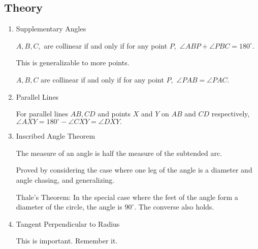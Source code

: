 \subsection{Theory}

\begin{enumerate}
    \item Supplementary Angles
    
    \begin{itemize}
    
    \Item $A,B,C,$ are collinear if and only if for any point $P,$ $\angle ABP+\angle PBC=180^{\circ}.$
    
    \Item This is generalizable to more points.
    
    \Item $A,B,C$ are collinear if and only if for any point $P,$ $\angle PAB=\angle PAC.$
    
    \end{itemize}
 
    \item Parallel Lines
    
    \begin{itemize}
    
    \Item For parallel lines $AB,CD$ and points $X$ and $Y$ on $AB$ and $CD$ respectively, $\angle AXY=180^{\circ}-\angle CXY=\angle DXY.$
    
    \end{itemize}
    
    \item Inscribed Angle Theorem
    
    \begin{itemize}
    
    \Item The measure of an angle is half the measure of the subtended arc.
    
    \Item Proved by considering the case where one leg of the angle is a diameter and angle chasing, and generalizing.
    
    \Item Thale's Theorem: In the special case where the feet of the angle form a diameter of the circle, the angle is $90^{\circ}.$ The converse also holds.
    
    \end{itemize}
    
    \item Tangent Perpendicular to Radius
    
    \begin{itemize}
    
    \Item This is important. Remember it.
    

\end{itemize}
\end{enumerate}
